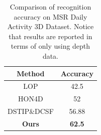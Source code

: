 \documentclass[review]{elsarticle}
\begin{document}
\begin{table}[H]
 	\begin{center}
 		\begin{tabular}{c|c}
 		
 		{\bf Method} & {\bf Accuracy} \\
 		\hline
       LOP \cite{wang2012mining} &       42.5 \\
 		
     HON4D \cite{oreifej2013hon4d} &         52 \\
 		
 		DSTIP\&DCSF \cite{xia2013spatio} &      56.88 \\
 		\hline
 		{\bf Ours} & {\bf 62.5} \\
 		
 		\end{tabular}
 	\end{center}
 	\caption{\label{lbl:Table_Daily3D}Comparison of recognition accuracy on MSR Daily Activity 3D Dataset. Notice that results are reported in terms of only using depth data.}
\end{table}
 
\end{document}
